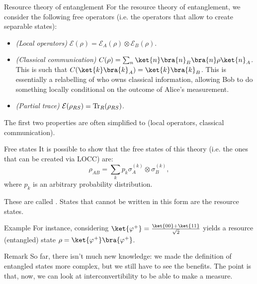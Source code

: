 \documentclass[a4paper]{article}
\begin{document}
\begin{parag}{Resource theory of entanglement}
    For the resource theory of entanglement, we consider the following free operators (i.e. the operators that allow to create separable states):
    \begin{itemize}
        \item \textit{(Local operators)} $\mathcal{E}\left(\rho\right) = \mathcal{E}_A\left(\rho\right) \otimes \mathcal{E}_B\left(\rho\right)$.
        \item \textit{(Classical communication)} $C\left(\rho\right) = \sum_{n} \ket{n}\bra{n}_B \bra{n}\rho \ket{n}_A$. This is such that $C\left(\ket{k}\bra{k}_A\right) = \ket{k}\bra{k}_B$. This is essentially a relabelling of who owns classical information, allowing Bob to do something locally conditional on the outcome of Alice's measurement.
        \item \textit{(Partial trace)} $\mathcal{E}\left(\rho_{RS}\right) = \Tr_R\left(\rho_{RS}\right)$.
    \end{itemize}
    
    The first two properties are often simplified to  (local operators, classical communication).

    \begin{subparag}{Free states}
        It is possible to show that the free states of this theory (i.e. the ones that can be created via LOCC) are:
        \[\rho_{AB} = \sum_{k} p_k \sigma_A^{\left(k\right)} \otimes \sigma_B^{\left(k\right)},\]
        where $p_k$ is an arbitrary probability distribution.
        
        These are called . States that cannot be written in this form are the resource states.
    \end{subparag}

    \begin{subparag}{Example}
        For instance, considering $\ket{\phi^+} = \frac{\ket{00} + \ket{11}}{\sqrt{2}}$ yields a resource (entangled) state $\rho = \ket{\phi^+}\bra{\phi^+}$.
    \end{subparag}

    \begin{subparag}{Remark}
        So far, there isn't much new knowledge: we made the definition of entangled states more complex, but we still have to see the benefits. The point is that, now, we can look at interconvertibility to be able to make a measure.
    \end{subparag}
\end{parag}
\end{document}
